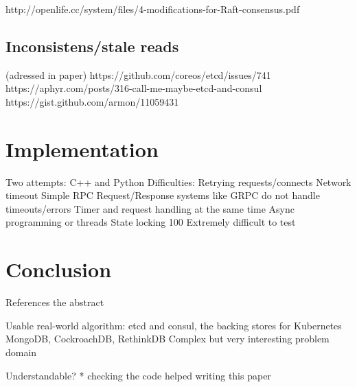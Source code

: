 http://openlife.cc/system/files/4-modifications-for-Raft-consensus.pdf

\subsection{Inconsistens/stale reads}
(adressed in paper)
https://github.com/coreos/etcd/issues/741
https://aphyr.com/posts/316-call-me-maybe-etcd-and-consul
https://gist.github.com/armon/11059431

\section{Implementation}
Two attempts: C++ and Python
Difficulties:
Retrying requests/connects
Network timeout
Simple RPC Request/Response systems like GRPC do not handle timeouts/errors 
Timer and request handling at the same time
Async programming or threads
State locking
100%
Extremely difficult to test

\section{Conclusion}
References the abstract

Usable real-world algorithm:
etcd and consul, the backing stores for Kubernetes
MongoDB, CockroachDB, RethinkDB
Complex but very interesting problem domain


Understandable?
* checking the code helped writing this paper


 


